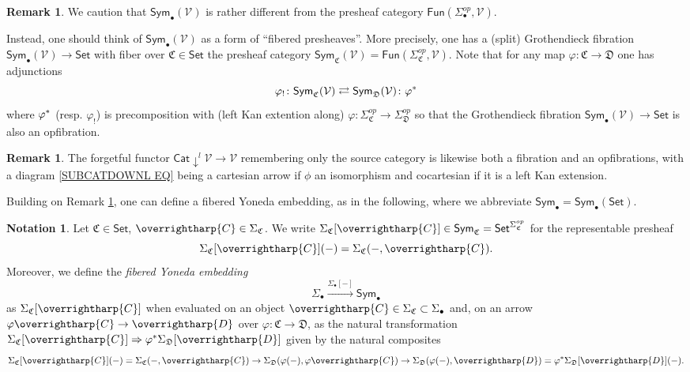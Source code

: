 \documentclass[a4paper,10pt
,draft
]{article}%
\numberwithin{equation}{section}
\numberwithin{figure}{section}
\theoremstyle{definition} %
\newtheorem{remark}[equation]{Remark}%
\newtheorem{notation}[equation]{Notation}%
\newcommand{\vect}[1]{\text{\overrightharp{\ensuremath{#1}}}}
\newcommand{\Sym}{\ensuremath{\mathsf{Sym}}}%
\newcommand{\V}{\ensuremath{\mathcal V}}
\newcommand{\1}{\ensuremath{\mathbbm 1}}%
\begin{document}
\begin{remark}\label{COLCHADJ REM}
We caution that 
$\mathsf{Sym}_{\bullet}(\V)$
is rather different from the presheaf category 
$\mathsf{Fun}(\Sigma_{\bullet}^{op},\V)$.

Instead, one should think of 
$\mathsf{Sym}_{\bullet}(\V)$
as a form of ``fibered presheaves''.
More precisely, 
one has a (split) Grothendieck fibration
$\mathsf{Sym}_{\bullet}(\V) \to \mathsf{Set}$
with fiber over 
$\mathfrak{C} \in \mathsf{Set}$
the presheaf category
$\Sym_{\mathfrak C}(\V)=
\mathsf{Fun}(\Sigma_{\mathfrak{C}}^{op},\mathcal{V})$.
Note that for any map
$\varphi \colon \mathfrak{C} \to \mathfrak{D}$
one has adjunctions
\begin{equation}\label{COLCHADJ EQ}
\varphi_! \colon \Sym_{\mathfrak C}(\V) 
\rightleftarrows 
\Sym_{\mathfrak D}(\V) \colon \varphi^{\**}
\end{equation}
where $\varphi^{\**}$
(resp. $\varphi_!$)
is precomposition with (left Kan extention along)
$\varphi\colon 
\Sigma^{op}_{\mathfrak{C}}
\to 
\Sigma^{op}_{\mathfrak{D}}
$
so that the Grothendieck fibration
$\mathsf{Sym}_{\bullet}(\V) \to \mathsf{Set}$
is also an opfibration. 
\end{remark}


\begin{remark}\label{SUBCOCART REM}
The forgetful functor $\mathsf{Cat} \downarrow^l \mathcal{V} \to \mathcal{V}$
remembering only the source category is likewise both a fibration and an opfibrations, 
with a diagram \eqref{SUBCATDOWNL EQ}
being a cartesian arrow if  $\phi$ an isomorphism
and cocartesian if it is a left Kan extension. 
\end{remark}


Building on Remark \ref{COLCHADJ REM},
one can define a fibered Yoneda embedding, as in the following,
where we abbreviate
$\mathsf{Sym}_{\bullet} = \mathsf{Sym}_{\bullet}(\mathsf{Set})$.

\begin{notation}\label{FIBYON NOT}
Let $\mathfrak{C} \in \mathsf{Set}$, $\vect{C} \in \Sigma_{\mathfrak{C}}$.
We write
$\Sigma_{\mathfrak{C}}[\vect{C}] 
\in \mathsf{Sym}_{\mathfrak{C}} = \mathsf{Set}^{\Sigma_{\mathfrak{C}}^{op}}$ for the representable presheaf
\[\Sigma_{\mathfrak{C}}[\vect{C}](-)
= \Sigma_{\mathfrak{C}}(-,\vect{C}).\]
Moreover, we define the \emph{fibered Yoneda embedding}
\begin{equation}\label{FIBYON EQ}
\Sigma_{\bullet} \xrightarrow{\Sigma_{\bullet}[-]} \mathsf{Sym}_{\bullet}
\end{equation}
as $\Sigma_{\mathfrak{C}}[\vect{C}]$
when evaluated on an object
$\vect{C} \in \Sigma_{\mathfrak{C}} \subset \Sigma_{\bullet}$
and, on an arrow 
$\varphi \vect{C} \to \vect{D}$
over $\varphi \colon \mathfrak{C} \to \mathfrak{D}$,
as the natural transformation
$\Sigma_{\mathfrak{C}}[\vect{C}]
\Rightarrow
\varphi^{\**}
\Sigma_{\mathfrak{D}}[\vect{D}]
$ given by the natural composites
\[\Sigma_{\mathfrak{C}}[\vect{C}](-)
= \Sigma_{\mathfrak{C}}(-,\vect{C})
\to 
\Sigma_{\mathfrak{D}}(\varphi(-),\varphi\vect{C})
\to
\Sigma_{\mathfrak{D}}(\varphi(-),\vect{D})
=
\varphi^{\**} \Sigma_{\mathfrak{D}}[\vect{D}](-).
\]
\end{notation}
\end{document}
